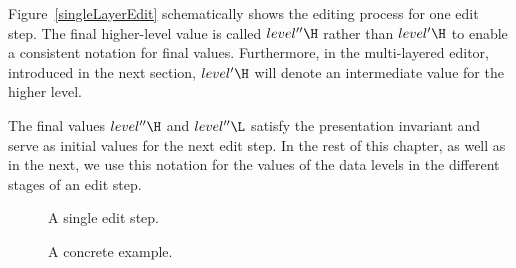 Figure~\ref{singleLayerEdit} schematically shows the editing process for one edit step.  The final higher-level value is called $level''\H$ rather than $level'\H$ to enable a consistent notation for final values. Furthermore, in the multi-layered editor, introduced in the next section, $level'\H$ will denote an intermediate value for the higher level.

The final values $level''\H$ and $level''\L$ satisfy the presentation invariant and serve as initial values for the next edit step. In the rest of this chapter, as well as in the next, we use this notation for the values of the data levels in the different stages of an edit step.

\begin{figure}[h]
  \hfill
  \begin{minipage}[b]{.45\textwidth}
    \begin{center}   
      \caption{A single edit step.} \label{singleLayerEdit}  %
    \end{center}
  \end{minipage}
  \hfill
  \begin{minipage}[b]{.45\textwidth}
    \begin{center}  
      \caption{A concrete example.} \label{singleLayerEditExample} %
    \end{center}
  \end{minipage}
  \hfill
\end{figure}

%


